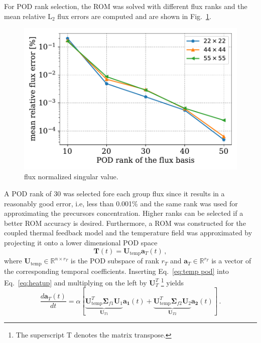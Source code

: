 \documentclass[]{interact}
\theoremstyle{plain}%
\theoremstyle{definition}
\theoremstyle{remark}
\begin{document}
For POD rank selection, the ROM was solved with different flux ranks and the mean relative L$_2$ flux errors are computed and are shown in Fig.~\ref{fig:POD flux rank}.
\begin{figure}[h!]
	\includegraphics[width=1.0\linewidth]{../figures/flux_rank_convergence.pdf}
	\caption{flux normalized singular value.}
	\label{fig:POD flux rank}
\end{figure}
A POD rank of 30 was selected fore each group flux since it results in a reasonably good error, i.e, less than 0.001\% and the same rank was used for approximating the precursors concentration.
Higher ranks can be selected if a better ROM accuracy is desired.
Furthermore, a ROM was constructed for the coupled thermal feedback model and the temperature field was approximated by projecting it onto a lower dimensional POD space
\begin{equation}
	\mathbf{T}(t) = \mathbf{U}_{\text{temp}}\mathbf{a}_T(t) \, ,
	\label{eq:temp pod}
\end{equation}
where $\mathbf{U}_{\text{temp}}\in\mathbb{R}^{n \times r_T} $ is the POD subspace of rank $r_T$ and $\mathbf{a}_T\in \mathbb{R}^{r_T}$ is a vector of the corresponding temporal coefficients. 
Inserting Eq.~\ref{eq:temp pod} into Eq.~\ref{eq:heatup} and multiplying on the left by $\mathbf{U}_T^T$ \footnote{The superscript T denotes the matrix transpose.} yields
\begin{equation}
	\frac{d\mathbf{a}_T(t)}{dt}  = \alpha [\underbrace{\mathbf{U}_{\text{temp}}^T \boldsymbol{\Sigma}_{f1}\mathbf{U}_1}_{\mathbf{U}_{T1}}\mathbf{a_1}(t) + \underbrace{\mathbf{U}_{\text{temp}}^T\boldsymbol{\Sigma}_{f2}\mathbf{U}_2}_{\mathbf{U}_{T2}}\mathbf{a_2}(t)] \, .
	\label{eq:reduced temp}
\end{equation}
\end{document}
